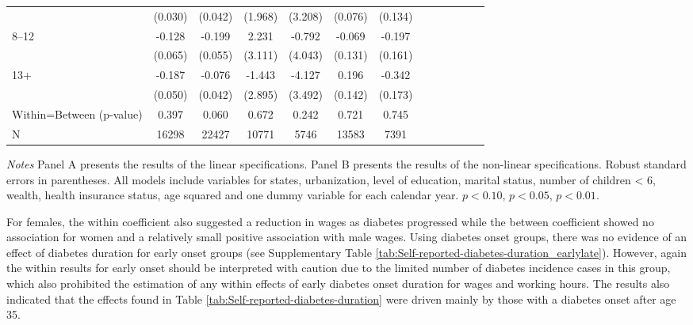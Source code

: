 \documentclass[12pt,english]{article}
\begin{document}
\begin{table}[!ht]
\begin{center}
\begin{adjustbox}{max width=.9\linewidth}
\begin{threeparttable}
{\begin{tabular}{l*{6}{S S}}
						&  (0.030)         &  (0.042)         &  (1.968)         &  (3.208)         &  (0.076)         &  (0.134)         \\
						8--12&  -0.128\sym{**} &   -0.199\sym{***}&    2.231         &   -0.792         &   -0.069         &   -0.197         \\
						&  (0.065)         &  (0.055)         &  (3.111)         &  (4.043)         &  (0.131)         &  (0.161)         \\
						13+&   -0.187\sym{***}&   -0.076\sym{*}  &   -1.443         &   -4.127         &    0.196         &   -0.342\sym{**} \\
						&  (0.050)         &  (0.042)         &  (2.895)         &  (3.492)         &  (0.142)         &  (0.173)         \\
						Within=Between (p-value)&  0.397         &    0.060         &    0.672         &    0.242         &    0.721         &    0.745         \\
						\midrule
						N         &    16298         &    22427         &    10771         &     5746         &    13583         &     7391         \\
						\bottomrule
					\end{tabular}
					\begin{tablenotes}
						\item \footnotesize \textit{Notes} Panel A presents the results of the linear specifications. Panel B presents the results of the non-linear specifications. Robust standard errors in parentheses. All models include variables for  states, urbanization, level of education, marital status, number of children < 6, wealth, health insurance status, age squared and one dummy variable for each calendar year. \sym{*} \(p<0.10\), \sym{**} \(p<0.05\), \sym{***} \(p<0.01\).
					\end{tablenotes}
				}
			\end{threeparttable}
		\end{adjustbox}
	\end{center}
\end{table}
For females, the within coefficient also suggested a reduction in wages as diabetes progressed while the between coefficient showed no association for women and a relatively small positive association with male wages. Using diabetes onset groups, there was no evidence of an effect of diabetes duration for early onset groups (see Supplementary Table \ref{tab:Self-reported-diabetes-duration_earlylate}). However, again the within results for early onset should be interpreted with caution due to the limited number of diabetes incidence cases in this group, which also prohibited the estimation of any within effects of early diabetes onset duration for wages and working hours. The results also indicated that the effects found in Table \ref{tab:Self-reported-diabetes-duration} were driven mainly by those with a diabetes onset after age 35.
\end{document}
